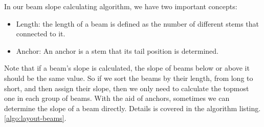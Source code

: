 In our beam slope calculating algorithm, we have two important concepts:
\begin{itemize}
    \item Length:
the length of a beam is defined as the number of different stems that connected to it. 
    \item Anchor:
        An anchor is a stem that its tail position is determined.
\end{itemize}

Note that if a beam's slope is calculated, the slope of beams below or above it should be the same value. So if we sort the beams by their length, from long to short, and then assign their slope, then we only need to calculate the topmost one in each group of beams. With the aid of anchors, sometimes we can determine the slope of a beam directly. Details is covered in the algorithm listing. \ref{algo:layout-beams}.

